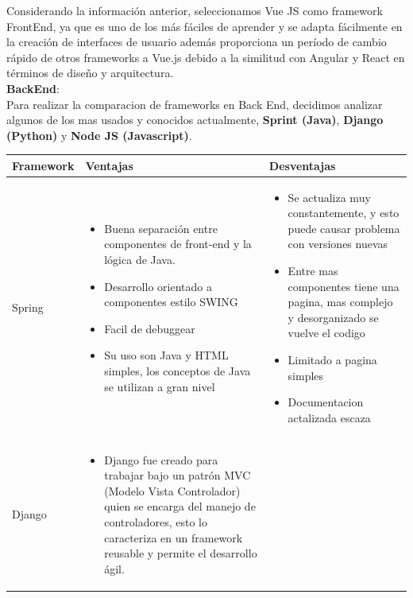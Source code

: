 \documentclass[a4paper,12 pt]{article}
\begin{document}
Considerando la información anterior, seleccionamos Vue JS como framework FrontEnd, ya que es uno de los más fáciles de aprender y se adapta fácilmente en la creación de interfaces de usuario además proporciona un período de cambio rápido de otros frameworks a Vue.js debido a la similitud con Angular y React en términos de diseño y arquitectura.\\

\textbf{BackEnd}:\\

Para realizar la comparacion de frameworks en Back End, decidimos analizar algunos de los mas usados y conocidos actualmente, \textbf{Sprint (Java)}, \textbf{Django (Python)} y \textbf{Node JS (Javascript)}.\\


\begin{table}[H]
    \centering
    \small{
    \begin{tabular}{|M{2.5cm}|M{6.5cm}|M{6.5cm}|}
        \hline
        \textbf{Framework}  &\textbf{Ventajas}   &\textbf{Desventajas}\\
        \hline 
            Spring   & 
            \begin{itemize}
                \item Buena separación entre componentes de front-end y la lógica de Java.
                \item Desarrollo orientado a componentes estilo SWING
                \item Facil de debuggear
                \item Su uso son Java y HTML simples, los conceptos de Java se utilizan a gran nivel
            \end{itemize}   & 
            \begin{itemize}
                \item Se actualiza muy constantemente, y esto puede causar problema con versiones nuevas
                \item Entre mas componentes tiene una pagina, mas complejo y desorganizado se vuelve el codigo
                \item Limitado a pagina simples
                \item Documentacion actalizada escaza
            \end{itemize}
            \\
        \hline
            Django & 
            \begin{itemize}
                \item Django fue creado para trabajar bajo un patrón MVC (Modelo Vista Controlador) quien se encarga del manejo de controladores, esto lo caracteriza en un framework reusable y permite el desarrollo ágil.

\end{itemize}
\end{tabular}}
\end{table}
\end{document}
